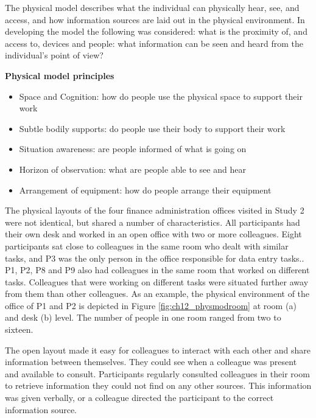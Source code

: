 The physical model describes what the individual can physically hear, see, and access, and how information sources are laid out in the physical environment. In developing the model the following was considered: what is the proximity of, and access to, devices and people: what information can be seen and heard from the individual's point of view?

\begin{framed}\noindent
\textbf{Physical model principles}

\begin{itemize}
\item Space and Cognition: how do people use the physical space to support their work
\item Subtle bodily supports: do people use their body to support their work
\item Situation awareness: are people informed of what is going on
\item Horizon of observation: what are people able to see and hear
\item Arrangement of equipment: how do people arrange their equipment
\end{itemize}

\end{framed}

The physical layouts of the four finance administration offices visited in Study 2 were not identical, but shared a number of characteristics. All participants had their own desk and worked in an open office with two or more colleagues. Eight participants sat close to colleagues in the same room who dealt with similar tasks, and P3 was the only person in the office responsible for data entry tasks.. P1, P2, P8 and P9 also had colleagues in the same room that worked on different tasks. Colleagues that were working on different tasks were situated further away from them than other colleagues. As an example, the physical environment of the office of P1 and P2 is depicted in Figure \ref{fig:ch12_physmodroom} at room (a) and desk (b) level. The number of people in one room ranged from two to sixteen. 

The open layout made it easy for colleagues to interact with each other and share information between themselves. They could see when a colleague was present and available to consult. Participants regularly consulted colleagues in their room to retrieve information they could not find on any other sources. This information was given verbally, or a colleague directed the participant to the correct information source.


